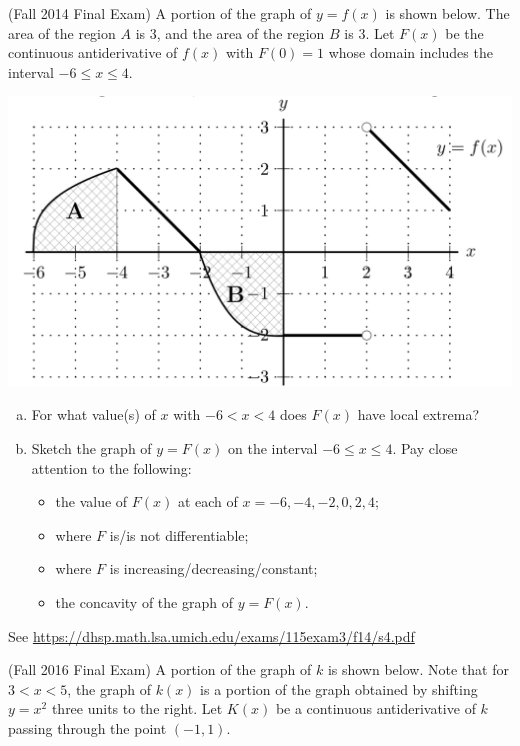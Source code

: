 \documentclass[11pt]{exam}
\begin{document}
\begin{questions}
\question (Fall 2014 Final Exam) %
	A portion of the graph of $y = f(x)$ is shown below.	 The area of the region $A$ is $3$, and the area of the region $B$ is $3$. Let $F(x)$ be the continuous antiderivative of $f(x)$ with $F(0) = 1$ whose domain includes the interval $-6 \leqslant x \leqslant 4$.
        \begin{center}
	\includegraphics[scale=0.45]{Figures/graphf}
        \end{center}
	\begin{enumerate}[(a)]
		\item For what value(s) of $x$ with $-6 < x < 4$ does $F(x)$ have local extrema?
		\item Sketch the graph of $y = F(x)$ on the interval $-6 \leqslant x \leqslant 4$.
Pay close attention to the following:
\begin{itemize}
\item the value of $F(x)$ at each of $x = -6, -4, -2, 0, 2, 4$;
\item where $F$ is/is not differentiable;
\item where $F$ is increasing/decreasing/constant;
\item the concavity of the graph of $y = F (x)$.
\end{itemize}
\end{enumerate}
\begin{solution}
  See \href{https://dhsp.math.lsa.umich.edu/exams/115exam3/f14/s4.pdf}{https://dhsp.math.lsa.umich.edu/exams/115exam3/f14/s4.pdf}
\end{solution}
\question (Fall 2016 Final Exam) %
	A portion of the graph of $k$ is shown below. Note that for $3 < x < 5$, the graph of $k(x)$ is a portion of the graph obtained by shifting $y=x^2$ three units to the right. Let $K(x)$ be a continuous antiderivative of $k$ passing through the point $(-1,1)$.

\end{questions}
\end{document}
